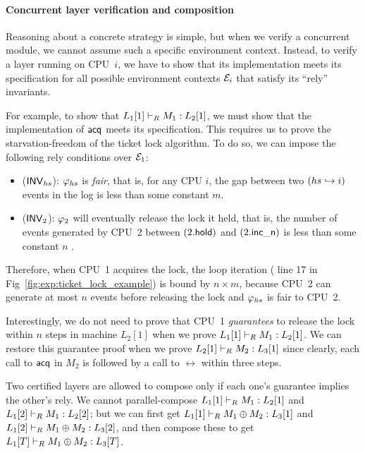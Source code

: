 \paragraph{Concurrent layer verification and composition}
Reasoning about a concrete strategy is simple, but when we verify
a concurrent module, we cannot assume such a specific environment context.
Instead, to verify
a layer running on CPU~$i$, we have to show that its implementation
meets its specification for all possible environment contexts
$\mathcal{E}_i$ that satisfy its ``rely'' invariants.

For example, to show that $L_1[1] \vdash_{R} M_1 : L_2[1]$, we must
show that the implementation of $\mathsf{acq}$ meets its specification.
This requires us to prove the starvation-freedom of the ticket
lock algorithm. To do so, we can impose the following rely conditions
over $\mathcal{E}_1$:
\begin{itemize} \itemsep 0pt
\item ($\mathsf{INV}_{hs}$):  $\varphi_{hs}$ is \emph{fair}, that is,
  for any CPU $i$, the gap between two $(hs \hookrightarrow i)$ events
  in the log is less than some constant $m$.
\item ($\mathsf{INV}_{2}$):  $\varphi_{2}$ will eventually release the
  lock it held, that is, the number of events generated by CPU~2
  between $(2.\mathsf{hold})$ and $(2.\mathsf{inc\_n})$   is less
  than some constant $n$ .
\end{itemize}
Therefore, when CPU~1 acquires the lock, the loop iteration (\cf
line 17 in Fig~\ref{fig:exp:ticket_lock_example}) is bound by
$n \times m$, because CPU~2 can generate at most $n$ events before
releasing the lock and $\varphi_{hs}$ is fair to CPU~2.

Interestingly, we do not need
to prove that CPU~1 \emph{guarantees} to release the lock within $n$
steps in machine $L_2[1]$
when we prove $L_1[1] \vdash_{R} M_1 : L_2[1]$.  We can restore
this guarantee proof when we prove $L_2[1] \vdash_{R} M_2 : L_3[1]$
since clearly, each call to $\mathsf{acq}$ in $M_2$ is followed by a call to
$\rel$ within three steps.

Two certified layers are allowed to compose only if each one's guarantee
implies the other's rely. We cannot parallel-compose
$L_1[1] \vdash_{R} M_1 : L_2[1]$ and $L_1[2] \vdash_{R} M_1 : L_2[2]$;
but we can first get $L_1[1] \vdash_{R} M_1\oplus{}M_2 : L_3[1]$ and
$L_1[2] \vdash_{R} M_1\oplus{}M_2 : L_3[2]$, and then compose these to
get $L_1[T] \vdash_{R} M_1\oplus{}M_2 : L_3[T]$.



